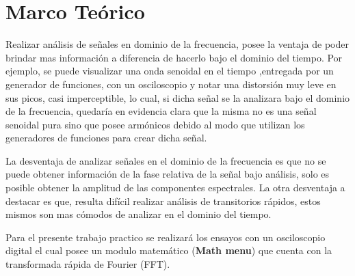   \section{Marco Teórico}

    Realizar análisis de señales en dominio de la frecuencia, posee la ventaja de poder 
    brindar mas información a diferencia de hacerlo bajo el dominio del tiempo. 
    Por ejemplo, se puede visualizar una onda senoidal en el tiempo ,entregada 
    por un generador de funciones, con un osciloscopio y notar una distorsión muy leve 
    en sus picos, casi imperceptible, lo cual, si dicha señal se la analizara bajo el 
    dominio de la frecuencia, quedaría en evidencia clara que la misma no es una señal 
    senoidal pura sino que posee armónicos debido al modo que utilizan los generadores 
    de funciones para crear dicha señal.
    
    La desventaja de analizar señales en el 
    dominio de la frecuencia es que no se puede obtener información de la fase relativa de 
    la señal bajo análisis, solo es posible obtener la amplitud de las componentes
    espectrales. La otra desventaja a destacar es que, resulta difícil realizar análisis de 
    transitorios rápidos, estos mismos son mas cómodos de analizar en el dominio del tiempo.
    
    Para el presente trabajo practico se realizará los ensayos con un osciloscopio digital 
    el cual posee un modulo matemático (\textbf{Math menu}) que cuenta con la transformada 
    rápida de Fourier (FFT). 

        
    




